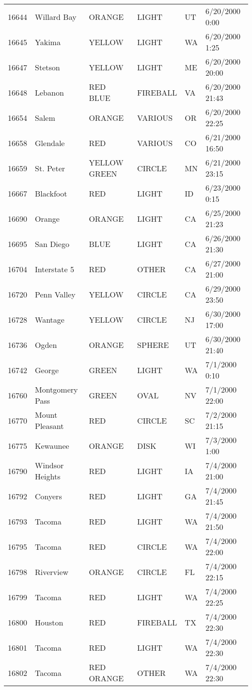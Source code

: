 \begin{tabular}{llllll}
16644 & Willard Bay & ORANGE & LIGHT & UT & 6/20/2000 0:00 \\
16645 & Yakima & YELLOW & LIGHT & WA & 6/20/2000 1:25 \\
16647 & Stetson & YELLOW & LIGHT & ME & 6/20/2000 20:00 \\
16648 & Lebanon & RED BLUE & FIREBALL & VA & 6/20/2000 21:43 \\
16654 & Salem & ORANGE & VARIOUS & OR & 6/20/2000 22:25 \\
16658 & Glendale & RED & VARIOUS & CO & 6/21/2000 16:50 \\
16659 & St. Peter & YELLOW GREEN & CIRCLE & MN & 6/21/2000 23:15 \\
16667 & Blackfoot & RED & LIGHT & ID & 6/23/2000 0:15 \\
16690 & Orange & ORANGE & LIGHT & CA & 6/25/2000 21:23 \\
16695 & San Diego & BLUE & LIGHT & CA & 6/26/2000 21:30 \\
16704 & Interstate 5 & RED & OTHER & CA & 6/27/2000 21:00 \\
16720 & Penn Valley & YELLOW & CIRCLE & CA & 6/29/2000 23:50 \\
16728 & Wantage & YELLOW & CIRCLE & NJ & 6/30/2000 17:00 \\
16736 & Ogden & ORANGE & SPHERE & UT & 6/30/2000 21:40 \\
16742 & George & GREEN & LIGHT & WA & 7/1/2000 0:10 \\
16760 & Montgomery Pass & GREEN & OVAL & NV & 7/1/2000 22:00 \\
16770 & Mount Pleasant & RED & CIRCLE & SC & 7/2/2000 21:15 \\
16775 & Kewaunee & ORANGE & DISK & WI & 7/3/2000 1:00 \\
16790 & Windsor Heights & RED & LIGHT & IA & 7/4/2000 21:00 \\
16792 & Conyers & RED & LIGHT & GA & 7/4/2000 21:45 \\
16793 & Tacoma & RED & LIGHT & WA & 7/4/2000 21:50 \\
16795 & Tacoma & RED & CIRCLE & WA & 7/4/2000 22:00 \\
16798 & Riverview & ORANGE & CIRCLE & FL & 7/4/2000 22:15 \\
16799 & Tacoma & RED & LIGHT & WA & 7/4/2000 22:25 \\
16800 & Houston & RED & FIREBALL & TX & 7/4/2000 22:30 \\
16801 & Tacoma & RED & LIGHT & WA & 7/4/2000 22:30 \\
16802 & Tacoma & RED ORANGE & OTHER & WA & 7/4/2000 22:30 \\

\end{tabular}
